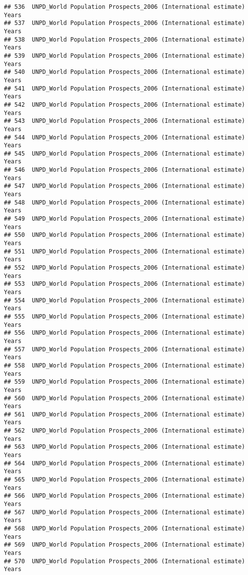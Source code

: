 \documentclass[]{article}
\begin{document}
\begin{verbatim}
## 536  UNPD_World Population Prospects_2006 (International estimate) Years
## 537  UNPD_World Population Prospects_2006 (International estimate) Years
## 538  UNPD_World Population Prospects_2006 (International estimate) Years
## 539  UNPD_World Population Prospects_2006 (International estimate) Years
## 540  UNPD_World Population Prospects_2006 (International estimate) Years
## 541  UNPD_World Population Prospects_2006 (International estimate) Years
## 542  UNPD_World Population Prospects_2006 (International estimate) Years
## 543  UNPD_World Population Prospects_2006 (International estimate) Years
## 544  UNPD_World Population Prospects_2006 (International estimate) Years
## 545  UNPD_World Population Prospects_2006 (International estimate) Years
## 546  UNPD_World Population Prospects_2006 (International estimate) Years
## 547  UNPD_World Population Prospects_2006 (International estimate) Years
## 548  UNPD_World Population Prospects_2006 (International estimate) Years
## 549  UNPD_World Population Prospects_2006 (International estimate) Years
## 550  UNPD_World Population Prospects_2006 (International estimate) Years
## 551  UNPD_World Population Prospects_2006 (International estimate) Years
## 552  UNPD_World Population Prospects_2006 (International estimate) Years
## 553  UNPD_World Population Prospects_2006 (International estimate) Years
## 554  UNPD_World Population Prospects_2006 (International estimate) Years
## 555  UNPD_World Population Prospects_2006 (International estimate) Years
## 556  UNPD_World Population Prospects_2006 (International estimate) Years
## 557  UNPD_World Population Prospects_2006 (International estimate) Years
## 558  UNPD_World Population Prospects_2006 (International estimate) Years
## 559  UNPD_World Population Prospects_2006 (International estimate) Years
## 560  UNPD_World Population Prospects_2006 (International estimate) Years
## 561  UNPD_World Population Prospects_2006 (International estimate) Years
## 562  UNPD_World Population Prospects_2006 (International estimate) Years
## 563  UNPD_World Population Prospects_2006 (International estimate) Years
## 564  UNPD_World Population Prospects_2006 (International estimate) Years
## 565  UNPD_World Population Prospects_2006 (International estimate) Years
## 566  UNPD_World Population Prospects_2006 (International estimate) Years
## 567  UNPD_World Population Prospects_2006 (International estimate) Years
## 568  UNPD_World Population Prospects_2006 (International estimate) Years
## 569  UNPD_World Population Prospects_2006 (International estimate) Years
## 570  UNPD_World Population Prospects_2006 (International estimate) Years

\end{verbatim}
\end{document}
